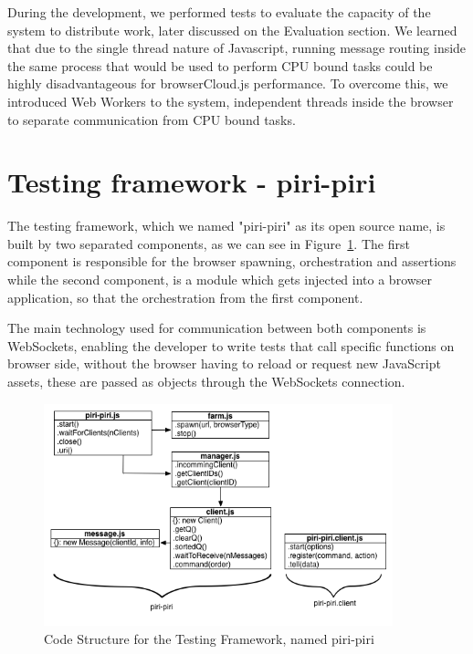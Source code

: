 During the development, we performed tests to evaluate the capacity of the system to distribute work, later discussed on the Evaluation section. We learned that due to the single thread nature of Javascript, running message routing inside the same process that would be used to perform CPU bound tasks could be highly disadvantageous for browserCloud.js performance. To overcome this, we introduced Web Workers to the system, independent threads inside the browser to separate communication from CPU bound tasks.

\section{Testing framework - piri-piri}

The testing framework, which we named "piri-piri" as its open source name, is built by two separated components, as we can see in Figure~\ref{fig:d-p-p}. The first component is responsible for the browser spawning, orchestration and assertions while the second component, is a module which gets injected into a browser application, so that the orchestration from the first component.

The main technology used for communication between both components is WebSockets, enabling the developer to write tests that call specific functions on browser side, without the browser having to reload or request new JavaScript assets, these are passed as objects through the WebSockets connection.

\begin{figure}[h!]
  \centering
  \includegraphics[width=0.9\textwidth]{figs/diagram-piri-piri}
  \caption{Code Structure for the Testing Framework, named piri-piri}
  \label{fig:d-p-p}
\end{figure}

